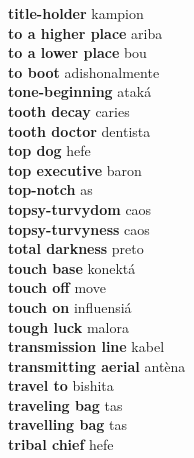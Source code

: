 \textbf{ title-holder  } kampion \\
\textbf{ to a higher place  } ariba \\
\textbf{ to a lower place  } bou \\
\textbf{ to boot  } adishonalmente \\
\textbf{ tone-beginning  } ataká \\
\textbf{ tooth decay  } caries \\
\textbf{ tooth doctor  } dentista \\
\textbf{ top dog  } hefe \\
\textbf{ top executive  } baron \\
\textbf{ top-notch  } as \\
\textbf{ topsy-turvydom  } caos \\
\textbf{ topsy-turvyness  } caos \\
\textbf{ total darkness  } preto \\
\textbf{ touch base  } konektá \\
\textbf{ touch off  } move \\
\textbf{ touch on  } influensiá \\
\textbf{ tough luck  } malora \\
\textbf{ transmission line  } kabel \\
\textbf{ transmitting aerial  } antèna \\
\textbf{ travel to  } bishita \\
\textbf{ traveling bag  } tas \\
\textbf{ travelling bag  } tas \\
\textbf{ tribal chief  } hefe \\
